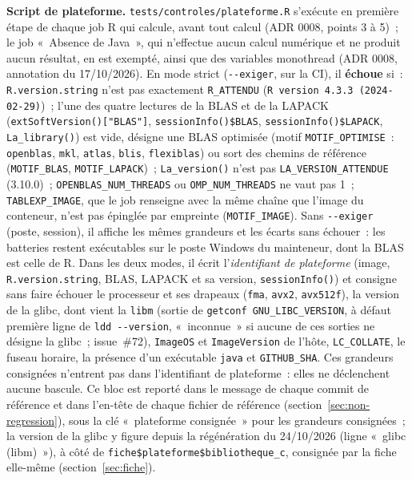\documentclass[a4paper,11pt]{article}
\newcommand{\code}[1]{\texttt{\small #1}}
\begin{document}
\medskip
\textbf{Script de plateforme.} \code{tests/controles/plateforme.R} s'exécute en
première étape de chaque job R qui calcule, avant tout calcul (ADR 0008,
points 3 à 5)~; le job «~Absence de Java~», qui n'effectue aucun calcul
numérique et ne produit aucun résultat, en est exempté, ainsi que des
variables monothread (ADR 0008, annotation du 17/10/2026).
En mode strict (\code{-{}-exiger}, sur la CI), il \textbf{échoue} si~:
\code{R.version.string} n'est pas exactement \code{R\_ATTENDU}
(\code{R version 4.3.3 (2024-02-29)})~; l'une des quatre lectures de la BLAS et
de la LAPACK (\code{extSoftVersion()["BLAS"]}, \code{sessionInfo()\$BLAS},
\code{sessionInfo()\$LAPACK}, \code{La\_library()}) est vide, désigne une BLAS
optimisée (motif \code{MOTIF\_OPTIMISE}~: \code{openblas}, \code{mkl},
\code{atlas}, \code{blis}, \code{flexiblas}) ou sort des chemins de référence
(\code{MOTIF\_BLAS}, \code{MOTIF\_LAPACK})~; \code{La\_version()} n'est pas
\code{LA\_VERSION\_ATTENDUE} (3.10.0)~; \code{OPENBLAS\_NUM\_THREADS} ou
\code{OMP\_NUM\_THREADS} ne vaut pas 1~; \code{TABLEXP\_IMAGE}, que le job
renseigne avec la même chaîne que l'image du conteneur, n'est pas épinglée par
empreinte (\code{MOTIF\_IMAGE}). Sans \code{-{}-exiger} (poste, session), il
affiche les mêmes grandeurs et les écarts sans échouer~: les batteries restent
exécutables sur le poste Windows du mainteneur, dont la BLAS est celle de R.
Dans les deux modes, il écrit l'\emph{identifiant de plateforme} (image,
\code{R.version.string}, BLAS, LAPACK et sa version, \code{sessionInfo()}) et
consigne sans faire échouer le processeur et ses drapeaux (\code{fma},
\code{avx2}, \code{avx512f}), la version de la glibc, dont vient la
\code{libm} (sortie de \code{getconf GNU\_LIBC\_VERSION}, à défaut première
ligne de \code{ldd -{}-version}, «~inconnue~» si aucune de ces sorties ne
désigne la glibc~; issue~\#72),
\code{ImageOS} et \code{ImageVersion} de l'hôte,
\code{LC\_COLLATE}, le fuseau horaire, la présence d'un exécutable
\code{java} et \code{GITHUB\_SHA}. Ces grandeurs consignées n'entrent pas
dans l'identifiant de plateforme~: elles ne déclenchent aucune bascule. Ce
bloc est reporté dans le message de
chaque commit de référence et dans l'en-tête de chaque fichier de référence
(section~\ref{sec:non-regression}), sous la clé «~plateforme consignée~»
pour les grandeurs consignées~; la version de la glibc y figure depuis la
régénération du 24/10/2026 (ligne «~glibc (libm)~»), à côté de
\code{fiche\$plateforme\$bibliotheque\_c}, consignée par la fiche elle-même
(section~\ref{sec:fiche}).
\end{document}
